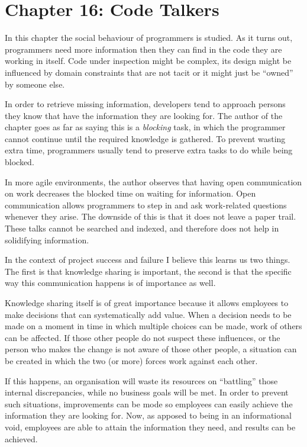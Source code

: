 \documentclass[]{uva-bachelor-thesis}
\begin{document}
\chapter{Chapter 16: Code Talkers \cite{makingsoftware}}
In this chapter the social behaviour of programmers is studied.
As it turns out, programmers need more information then they can find in the code they are working in itself. 
Code under inspection might be complex, its design might be influenced by domain constraints that are not tacit or it might just be ``owned'' by someone else.

In order to retrieve missing information, developers tend to approach persons they know that have the information they are looking for. 
The author of the chapter goes as far as saying this is a \emph{blocking} task, in which the programmer cannot continue until the required knowledge is gathered. 
To prevent wasting extra time, programmers usually tend to preserve extra tasks to do while being blocked.

In more agile environments, the author observes that having open communication on work decreases the blocked time on waiting for information.
Open communication allows programmers to step in and ask work-related questions whenever they arise.
The downside of this is that it does not leave a paper trail. 
These talks cannot be searched and indexed, and therefore does not help in solidifying information.

In the context of project success and failure I believe this learns us two things. 
The first is that knowledge sharing is important, the second is that the specific way this communication happens is of importance as well.

Knowledge sharing itself is of great importance because it allows employees to make decisions that can systematically add value.
When a decision needs to be made on a moment in time in which multiple choices can be made, work of others can be affected. 
If those other people do not suspect these influences, or the person who makes the change is not aware of those other people, a situation can be created in which the two (or more) forces work against each other. 

If this happens, an organisation will waste its resources on ``battling'' those internal discrepancies, while no business goals will be met. 
In order to prevent such situations, improvements can be mode so employees can easily achieve the information they are looking for. 
Now, as apposed to being in an informational void, employees are able to attain the information they need, and results can be achieved.
\end{document}
